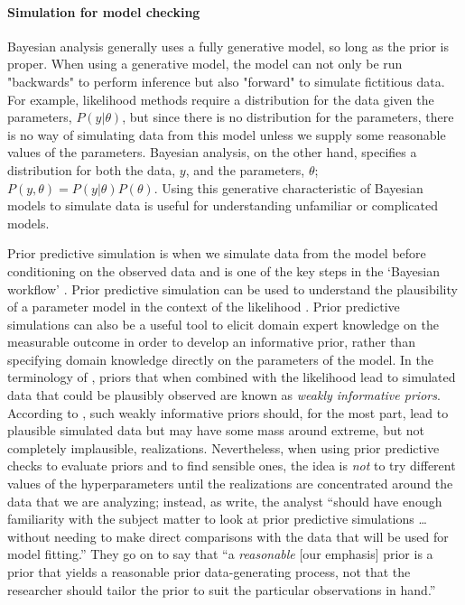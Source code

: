 \paragraph*{Simulation for model checking}

Bayesian analysis generally uses a fully generative model, so long as the prior is proper. When using a generative model, the model can not only be run "backwards" to perform inference but also "forward" to simulate fictitious data. For example, likelihood methods require a distribution for the data given the parameters, $P(y|\theta)$, but since there is no distribution for the parameters, there is no way of simulating data from this model unless we supply some reasonable values of the parameters. Bayesian analysis, on the other hand, specifies a distribution for both the data, $y$, and the parameters, $\theta$; $P(y, \theta) = P(y|\theta)P(\theta)$. Using this generative characteristic of Bayesian models to simulate data is useful for understanding unfamiliar or complicated models.

Prior predictive simulation is when we simulate data from the model before conditioning on the observed data and is one of the key steps in the `Bayesian workflow' \citep[Figure ~1]{gelman_bayesian_2020}. Prior predictive simulation can be used to understand the plausibility of a parameter model in the context of the likelihood \citep{gelman_2017}. Prior predictive simulations can also be a useful tool to elicit domain expert knowledge on the measurable outcome in order to develop an informative prior, rather than specifying domain knowledge directly on the parameters of the model. In the terminology of \cite{gabry_vis_2019}, priors that when combined with the likelihood lead to simulated data that could be plausibly observed are known as \textit{weakly informative priors}. According to \cite{gabry_vis_2019}, such weakly informative priors should, for the most part, lead to plausible simulated data but may have some mass around extreme, but not completely implausible, realizations. Nevertheless, when using prior predictive checks to evaluate priors and to find sensible ones, the idea is \textit{not} to try different values of the hyperparameters until the realizations are concentrated around the data that we are analyzing; instead, as \cite{gabry_vis_2019a} write, the analyst ``should have enough familiarity with the subject matter to look at prior predictive simulations \ldots without needing to make direct comparisons with the data that will be used for model fitting.'' They go on to say that ``a \textit{reasonable} [our emphasis] prior is a prior that yields a reasonable prior data-generating process, not that the researcher should tailor the prior to suit the particular observations in hand.''

